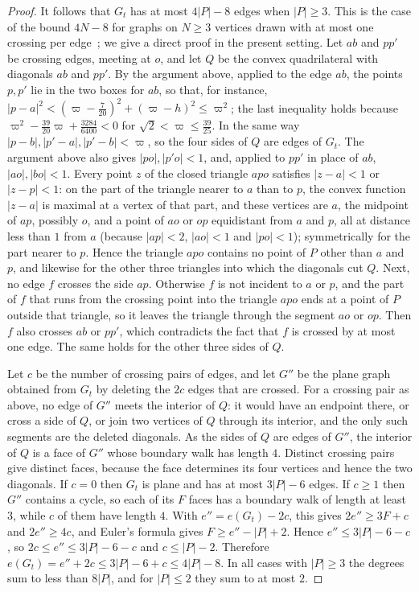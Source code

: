 \documentclass[11pt,colorlinks]{charlie}
\begin{document}
\begin{proof}
It follows that $G_t$ has at most $4|P|-8$ edges when $|P|\ge3$. This is the case of the bound $4N-8$ for graphs on $N\ge3$ vertices drawn with at most one crossing per edge~\cite{BSW,PachToth}; we give a direct proof in the present setting. Let $ab$ and $pp'$ be crossing edges, meeting at $o$, and let $Q$ be the convex quadrilateral with diagonals $ab$ and $pp'$. By the argument above, applied to the edge $ab$, the points $p,p'$ lie in the two boxes for $ab$, so that, for instance, $|p-a|^2<(\varpi-\tfrac7{20})^2+(\varpi-h)^2\le\varpi^2$; the last inequality holds because $\varpi^2-\tfrac{39}{20}\varpi+\tfrac{3284}{6400}<0$ for $\sqrt2<\varpi\le\tfrac{39}{25}$. In the same way $|p-b|,|p'-a|,|p'-b|<\varpi$, so the four sides of $Q$ are edges of $G_t$. The argument above also gives $|po|,|p'o|<1$, and, applied to $pp'$ in place of $ab$, $|ao|,|bo|<1$. Every point $z$ of the closed triangle $apo$ satisfies $|z-a|<1$ or $|z-p|<1$: on the part of the triangle nearer to $a$ than to $p$, the convex function $|z-a|$ is maximal at a vertex of that part, and these vertices are $a$, the midpoint of $ap$, possibly $o$, and a point of $ao$ or $op$ equidistant from $a$ and $p$, all at distance less than $1$ from $a$ (because $|ap|<2$, $|ao|<1$ and $|po|<1$); symmetrically for the part nearer to $p$. Hence the triangle $apo$ contains no point of $P$ other than $a$ and $p$, and likewise for the other three triangles into which the diagonals cut $Q$. Next, no edge $f$ crosses the side $ap$. Otherwise $f$ is not incident to $a$ or $p$, and the part of $f$ that runs from the crossing point into the triangle $apo$ ends at a point of $P$ outside that triangle, so it leaves the triangle through the segment $ao$ or $op$. Then $f$ also crosses $ab$ or $pp'$, which contradicts the fact that $f$ is crossed by at most one edge. The same holds for the other three sides of $Q$.

Let $c$ be the number of crossing pairs of edges, and let $G''$ be the plane graph obtained from $G_t$ by deleting the $2c$ edges that are crossed. For a crossing pair as above, no edge of $G''$ meets the interior of $Q$: it would have an endpoint there, or cross a side of $Q$, or join two vertices of $Q$ through its interior, and the only such segments are the deleted diagonals. As the sides of $Q$ are edges of $G''$, the interior of $Q$ is a face of $G''$ whose boundary walk has length $4$. Distinct crossing pairs give distinct faces, because the face determines its four vertices and hence the two diagonals. If $c=0$ then $G_t$ is plane and has at most $3|P|-6$ edges. If $c\ge1$ then $G''$ contains a cycle, so each of its $F$ faces has a boundary walk of length at least $3$, while $c$ of them have length $4$. With $e''=e(G_t)-2c$, this gives $2e''\ge3F+c$ and $2e''\ge4c$, and Euler's formula gives $F\ge e''-|P|+2$. Hence $e''\le3|P|-6-c$, so $2c\le e''\le3|P|-6-c$ and $c\le|P|-2$. Therefore $e(G_t)=e''+2c\le3|P|-6+c\le4|P|-8$. In all cases with $|P|\ge3$ the degrees sum to less than $8|P|$, and for $|P|\le2$ they sum to at most $2$.
\end{proof}
\end{document}
